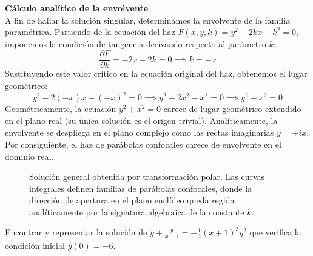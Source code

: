 \begin{tcolorbox}
\vspace{0.3cm}
\textbf{Cálculo analítico de la envolvente} \\
A fin de hallar la solución singular, determinamos la envolvente de la familia paramétrica. Partiendo de la ecuación del haz $F(x,y,k) = y^2 - 2kx - k^2 = 0$, imponemos la condición de tangencia derivando respecto al parámetro $k$:
$$ \frac{\partial F}{\partial k} = -2x - 2k = 0 \implies k = -x $$
Sustituyendo este valor crítico en la ecuación original del haz, obtenemos el lugar geométrico:
$$ y^2 - 2(-x)x - (-x)^2 = 0 \implies y^2 + 2x^2 - x^2 = 0 \implies y^2 + x^2 = 0 $$
Geométricamente, la ecuación $y^2 + x^2 = 0$ carece de lugar geométrico extendido en el plano real (su única solución es el origen trivial). Analíticamente, la envolvente se despliega en el plano complejo como las rectas imaginarias $y = \pm ix$. Por consiguiente, el haz de parábolas confocales carece de envolvente en el dominio real.

\begin{figure}[H]
    \centering
    
    \caption{Solución general obtenida por transformación polar. Las curvas integrales definen familias de parábolas confocales, donde la dirección de apertura en el plano euclídeo queda regida analíticamente por la signatura algebraica de la constante $k$.}
\end{figure}
\end{tcolorbox}

\begin{ejercicio}
Encontrar y representar la solución de $\dot{y} + \frac{y}{x+1} = -\frac{1}{2}(x+1)^3y^2$ que verifica la condición inicial $y(0) = -6$.
\end{ejercicio}

